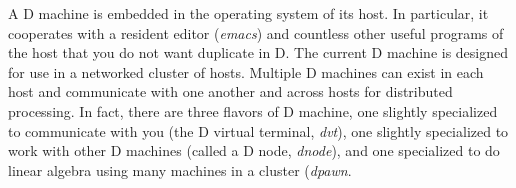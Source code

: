 A D machine is embedded in the operating system of its host. In particular, it cooperates with a resident editor (\emph{emacs}) and countless other useful programs of the host that you do not want duplicate in D. The current D machine is designed for use in a networked cluster of hosts. Multiple D machines can exist in each host and communicate with one another and across hosts for distributed processing. In fact, there are three flavors of D machine, one slightly specialized to communicate with you (the D virtual terminal, \emph{dvt}), one slightly specialized to work with other D machines (called a D node, \emph{dnode}), and one specialized to do linear algebra using many machines in a cluster (\emph{dpawn}. 

